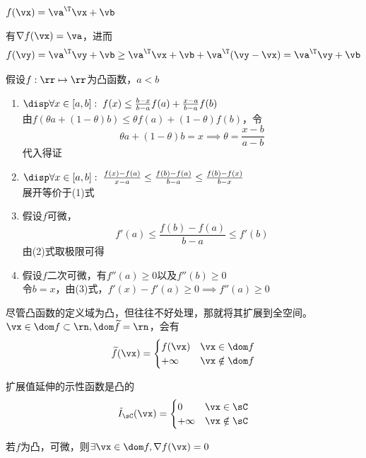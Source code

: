 \begin{example}
$f(\vx)=\va^\T \vx+\vb$
\end{example}
\begin{analysis}
有$\nabla f(\vx)=\va$，进而
\[f(\vy)=\va^\T \vy+\vb\geq \va^\T \vx+\vb+\va^\T(\vy-\vx)=\va^\T \vy+\vb\]
\end{analysis}

\begin{example}
	假设$f:\rr\mapsto\rr$为凸函数，$a<b$
	\begin{enumerate}
		\item $\disp\forall x\in[a,b]:\;f(x)\leq\frac{b-x}{b-a}f(a)+\frac{x-a}{b-a}f(b)$\\
		由$f(\theta a+(1-\theta)b)\leq \theta f(a)+(1-\theta)f(b)$，令
		\[\theta a+(1-\theta)b=x\implies\theta=\frac{x-b}{a-b}\]
		代入得证
		\item $\disp\forall x\in[a,b]:\;\frac{f(x)-f(a)}{x-a}\leq\frac{f(b)-f(a)}{b-a}\leq\frac{f(b)-f(x)}{b-x}$\\
		展开等价于(1)式
		\item 假设$f$可微，
		\[f'(a)\leq \frac{f(b)-f(a)}{b-a}\leq f'(b)\]
		由(2)式取极限可得
		\item 假设$f$二次可微，有$f''(a)\geq 0$以及$f''(b)\geq 0$\\
		令$b=x$，由(3)式，$f'(x)-f'(a)\geq 0\implies f''(a)\geq 0$
	\end{enumerate}
\end{example}

\begin{definition}
尽管凸函数的定义域为凸，但往往不好处理，那就将其扩展到全空间。
$\vx\in\dom f\subset\rn, \dom\widetilde{f}=\rn$，会有
\[\widetilde{f}(\vx)=\begin{cases}f(\vx)&\vx\in\dom f\\+\infty&\vx\notin\dom f\end{cases}\]
\end{definition}
\begin{example}[示性(indicator)函数]
	扩展值延伸的示性函数是凸的
\[\tilde{I}_\sC(\vx)=\begin{cases}0&\vx\in \sC\\ +\infty & \vx\notin \sC\end{cases}\]
\end{example}

\begin{theorem}
若$f$为凸，可微，则$\exists \vx\in\dom f,\nabla f(\vx)=0$
\end{theorem}

